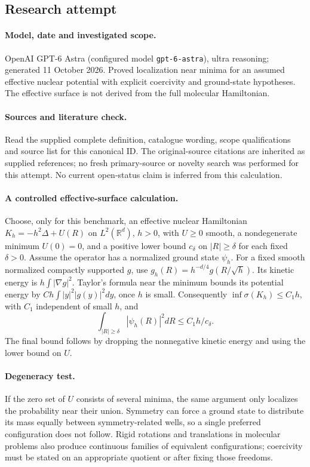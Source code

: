 \documentclass[11pt]{article}
\begin{document}
\subsection{Research attempt}
\paragraph{Model, date and investigated scope.}
OpenAI GPT-6 Astra (configured model \texttt{gpt-6-astra}), ultra reasoning; generated 11 October 2026. Proved localization near minima for an assumed effective nuclear potential with explicit coercivity and ground-state hypotheses. The effective surface is not derived from the full molecular Hamiltonian.

\paragraph{Sources and literature check.}
Read the supplied complete definition, catalogue wording, scope qualifications and source list for this canonical ID. The original-source citations are inherited as supplied references; no fresh primary-source or novelty search was performed for this attempt. No current open-status claim is inferred from this calculation.

\paragraph{A controlled effective-surface calculation.}Choose, only for this benchmark, an effective nuclear Hamiltonian \(K_h=-h^2\Delta+U(R)\) on \(L^2(\mathbb R^d)\), \(h>0\), with \(U\ge0\) smooth, a nondegenerate minimum \(U(0)=0\), and a positive lower bound \(c_\delta\) on \(|R|\ge\delta\) for each fixed \(\delta>0\). Assume the operator has a normalized ground state \(\psi_h\). For a fixed smooth normalized compactly supported \(g\), use \(g_h(R)=h^{-d/4}g(R/\sqrt h)\). Its kinetic energy is \(h\int|\nabla g|^2\). Taylor's formula near the minimum bounds its potential energy by \(Ch\int |y|^2|g(y)|^2dy\), once \(h\) is small. Consequently \(\inf\sigma(K_h)\le C_1h\), with \(C_1\) independent of small \(h\), and
\[\int_{|R|\ge\delta}|\psi_h(R)|^2dR\le C_1h/c_\delta.
\]
The final bound follows by dropping the nonnegative kinetic energy and using the lower bound on \(U\).
\paragraph{Degeneracy test.}If the zero set of \(U\) consists of several minima, the same argument only localizes the probability near their union. Symmetry can force a ground state to distribute its mass equally between symmetry-related wells, so a single preferred configuration does not follow. Rigid rotations and translations in molecular problems also produce continuous families of equivalent configurations; coercivity must be stated on an appropriate quotient or after fixing those freedoms.
\end{document}
